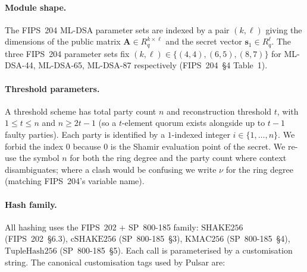 \documentclass[11pt,a4paper]{article}
\theoremstyle{definition}
\theoremstyle{remark}
\newcommand{\Rq}{R_q}
\newcommand{\SHAKE}{\mathrm{SHAKE256}}
\newcommand{\cSHAKE}{\mathrm{cSHAKE256}}
\newcommand{\KMAC}{\mathrm{KMAC256}}
\newcommand{\TupleHash}{\mathrm{TupleHash256}}
\begin{document}
\paragraph{Module shape.} The FIPS~204 ML-DSA parameter sets are
indexed by a pair $(k, \ell)$ giving the dimensions of the public
matrix $\mathbf{A} \in \Rq^{k \times \ell}$ and the secret vector
$\mathbf{s}_1 \in \Rq^\ell$. The three FIPS~204 parameter sets fix
$(k, \ell) \in \{(4, 4), (6, 5), (8, 7)\}$ for ML-DSA-44, ML-DSA-65,
ML-DSA-87 respectively (FIPS~204~\S4 Table~1).

\paragraph{Threshold parameters.} A threshold scheme has total party
count $n$ and reconstruction threshold $t$, with $1 \le t \le n$ and
$n \ge 2t - 1$ (so a $t$-element quorum exists alongside up to $t-1$
faulty parties). Each party is identified by a $1$-indexed integer
$i \in \{1, \dots, n\}$. We forbid the index $0$ because $0$ is the
Shamir evaluation point of the secret. We re-use the symbol $n$ for
both the ring degree and the party count where context disambiguates;
where a clash would be confusing we write $\nu$ for the ring degree
(matching FIPS~204's variable name).

\paragraph{Hash family.} All hashing uses the FIPS~202 +
SP~800-185 family: $\SHAKE$ (FIPS~202~\S6.3), $\cSHAKE$
(SP~800-185~\S3), $\KMAC$ (SP~800-185~\S4), $\TupleHash$
(SP~800-185~\S5). Each call is parameterised by a customisation
string. The canonical customisation tags used by Pulsar are:
\end{document}
